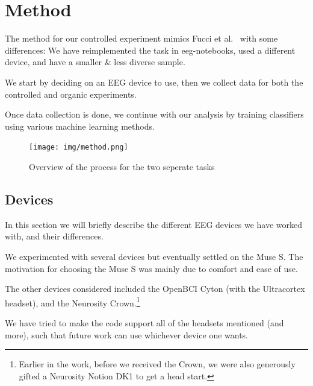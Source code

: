 \chapter{Method}

The method for our controlled experiment mimics Fucci et al.~\cite{fucci_replication_2019} with some differences: We have reimplemented the task in eeg-notebooks, used a different device, and have a smaller \& less diverse sample.

We start by deciding on an EEG device to use, then we collect data for both the controlled and organic experiments.

Once data collection is done, we continue with our analysis by training classifiers using various machine learning methods.

\begin{figure}[h]
    \begin{center}
        \texttt{[image: img/method.png]}
    \end{center}
    \caption{Overview of the process for the two seperate tasks}\label{fig:method}
\end{figure}

\pagebreak

\section{Devices}
    
    In this section we will briefly describe the different EEG devices we have worked with, and their differences.

    We experimented with several devices but eventually settled on the Muse S. The motivation for choosing the Muse S was mainly due to comfort and ease of use. 

    The other devices considered included the OpenBCI Cyton (with the Ultracortex headset), and the Neurosity Crown.\footnote{Earlier in the work, before we received the Crown, we were also generously gifted a Neurosity Notion DK1 to get a head start.} 

    We have tried to make the code support all of the headsets mentioned (and more), such that future work can use whichever device one wants.

    \vspace{0.5cm}

